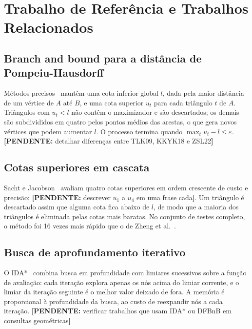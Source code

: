 \documentclass[9pt,a4paper,twocolumn]{extarticle}
\newif\ifmostrarorientacoes
\newcommand{\orientacao}[1]{%
  \ifmostrarorientacoes
    \par\smallskip
    \noindent\fcolorbox{black!35}{black!4}{%
      \parbox{0.94\columnwidth}{\fontsize{7.4}{8.2}\selectfont\textbf{Orientação aos autores:} #1}%
    }%
    \par\smallskip
  \fi
}
\newcommand{\pendente}[1]{{\color{red!70!black}\textbf{[PENDENTE:} #1\textbf{]}}}
\begin{document}
\section{Trabalho de Referência e Trabalhos Relacionados}
\orientacao{Apresente o artigo-base com precisão suficiente para que o leitor entenda
a técnica que será modificada. Discuta apenas a literatura necessária para posicionar
a proposta. Verifique trabalhos posteriores antes de afirmar novidade.}

\subsection{Branch and bound para a distância de Pompeiu-Hausdorff}
Métodos precisos~\parencite{tang2009interactive,kang2018fast,zheng2022economic}
mantêm uma cota inferior global $l$, dada pela maior distância de um vértice de $A$
até $B$, e uma cota superior $u_t$ para cada triângulo $t$ de $A$. Triângulos com
$u_t < l$ não contêm o maximizador e são descartados; os demais são subdivididos em
quatro pelos pontos médios das arestas, o que gera novos vértices que podem aumentar
$l$. O processo termina quando $\max_t u_t - l \le \varepsilon$.
\pendente{detalhar diferenças entre TLK09, KKYK18 e ZSL22}

\subsection{Cotas superiores em cascata}
Sacht e Jacobson~\parencite{sacht2024cascading} avaliam quatro cotas superiores em
ordem crescente de custo e precisão: \pendente{descrever $u_1$ a $u_4$ em uma frase
cada}. Um triângulo é descartado assim que alguma cota fica abaixo de $l$, de modo
que a maioria dos triângulos é eliminada pelas cotas mais baratas. No conjunto de
testes completo, o método foi 16 vezes mais rápido que o de Zheng et
al.~\parencite{zheng2022economic}.

\subsection{Busca de aprofundamento iterativo}
O IDA*~\parencite{korf1985depth} combina busca em profundidade com limiares sucessivos
sobre a função de avaliação: cada iteração explora apenas os nós acima do limiar
corrente, e o limiar da iteração seguinte é o melhor valor deixado de fora. A memória
é proporcional à profundidade da busca, ao custo de reexpandir nós a cada iteração.
\pendente{verificar trabalhos que usam IDA* ou DFBnB em consultas geométricas}
\end{document}
